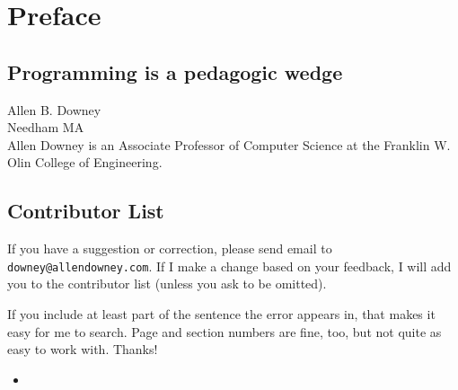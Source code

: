 \documentclass[10pt]{book}
\begin{document}
\chapter{Preface}

\section*{Programming is a pedagogic wedge}



Allen B. Downey \\
Needham MA\\

Allen Downey is an Associate Professor of Computer Science at 
the Franklin W. Olin College of Engineering.







\section*{Contributor List}


If you have a suggestion or correction, please send email to 
{\tt downey@allendowney.com}.  If I make a change based on your
feedback, I will add you to the contributor list
(unless you ask to be omitted).

If you include at least part of the sentence the
error appears in, that makes it easy for me to search.  Page and
section numbers are fine, too, but not quite as easy to work with.
Thanks!

\small

\begin{itemize}

\item 


\end{itemize}

\normalsize

\clearemptydoublepage

\begin{latexonly}

\tableofcontents

\clearemptydoublepage

\end{latexonly}
\end{document}
